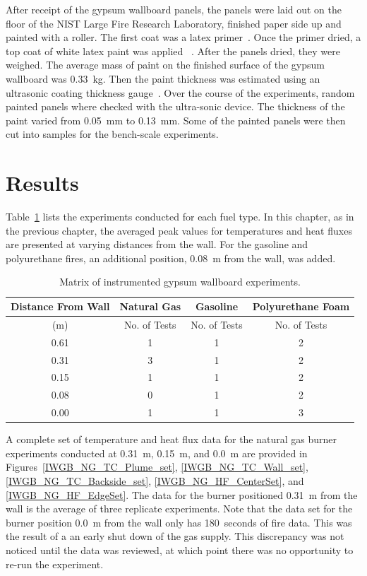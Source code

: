 \documentclass[twoside]{uocthesis}
\begin{document}
{After receipt of the gypsum wallboard panels, the panels were laid out on the floor of the NIST Large Fire Research Laboratory, finished paper side up and painted with a roller.  The first coat was a latex primer~\cite{Latex_Primer}.  Once the primer dried, a top coat of white latex paint was applied ~\cite{Latex_Paint}.  After the panels dried, they were weighed. The average mass of paint on the finished surface of the gypsum wallboard was 0.33~kg. Then the paint thickness was estimated using an ultrasonic coating thickness gauge~\cite{defelsko}.  Over the course of the experiments, random painted panels where checked with the ultra-sonic device. The thickness of the paint varied from 0.05~mm to 0.13~mm.  Some of the painted panels were then cut into samples for the bench-scale experiments.


\section{Results}

Table~\ref{tab:IWGB_experiments} lists the experiments conducted for each fuel type.  In this chapter, as in the previous chapter, the averaged peak values for temperatures and heat fluxes are presented at varying distances from the wall.  For the gasoline and polyurethane fires, an additional position, 0.08~m from the wall, was added.

\begin{table}[ht!]
	\centering
	\begin{tabular}{|c|c|c|c|}
		\hline Distance From Wall  	& Natural Gas 		& Gasoline			& Polyurethane Foam \\
		\hline (m) 					& No. of Tests 		& No. of Tests  	& No. of Tests 	    \\ 
		\hline 0.61 				& 1 				& 1 				& 2 			 	\\
		\hline 0.31					& 3	 				& 1					& 2 			 	\\
		\hline 0.15					& 1				 	& 1					& 2 			 	\\
		\hline 0.08					& 0 				& 1 				& 2 	 			\\
		\hline 0.00					& 1 				& 1 				& 3 	 			\\
		\hline
	\end{tabular}
	\caption[Matrix of instrumented gypsum wallboard experiments.]{Matrix of instrumented gypsum wallboard experiments.}
	\label{tab:IWGB_experiments}
\end{table}

A complete set of temperature and heat flux data for the natural gas burner experiments conducted at 0.31~m, 0.15~m, and 0.0~m are provided in Figures~\ref{IWGB_NG_TC_Plume_set}, \ref{IWGB_NG_TC_Wall_set}, \ref{IWGB_NG_TC_Backside_set}, \ref{IWGB_NG_HF_CenterSet}, and \ref{IWGB_NG_HF_EdgeSet}.  The data for the burner positioned 0.31~m from the wall is the average of three replicate experiments.  Note that the data set for the burner position 0.0~m from the wall only has 180~seconds of fire data.  This was the result of a an early shut down of the gas supply.  This discrepancy was not noticed until the data was reviewed, at which point there was no opportunity to re-run the experiment.    

}
\end{document}
